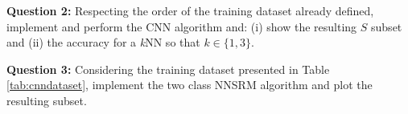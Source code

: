 \vspace{0.2cm}

\noindent \textbf{Question 2:} Respecting the order of the training dataset already defined, implement and perform the CNN algorithm and: (i) show the resulting $S$ subset and (ii) the accuracy for a \textit{k}NN so that $k \in \{1, 3\}$.

\vspace{0.2cm}

\noindent \textbf{Question 3:} Considering the training dataset presented in Table \ref{tab:cnndataset}, implement the two class NNSRM algorithm and plot the resulting subset.



